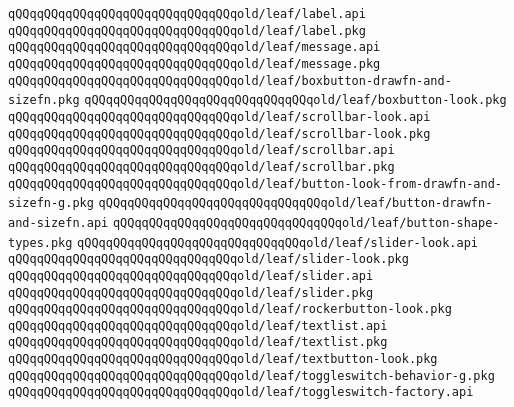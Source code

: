 \verb|qQQqqQQqqQQqqQQqqQQqqQQqqQQqqQQqold/leaf/label.api|\newline
\verb|qQQqqQQqqQQqqQQqqQQqqQQqqQQqqQQqold/leaf/label.pkg|\newline
\verb|qQQqqQQqqQQqqQQqqQQqqQQqqQQqqQQqold/leaf/message.api|\newline
\verb|qQQqqQQqqQQqqQQqqQQqqQQqqQQqqQQqold/leaf/message.pkg|\newline
\verb|qQQqqQQqqQQqqQQqqQQqqQQqqQQqqQQqold/leaf/boxbutton-drawfn-and-sizefn.pkg|\newline
\verb|qQQqqQQqqQQqqQQqqQQqqQQqqQQqqQQqold/leaf/boxbutton-look.pkg|\newline
\verb|qQQqqQQqqQQqqQQqqQQqqQQqqQQqqQQqold/leaf/scrollbar-look.api|\newline
\verb|qQQqqQQqqQQqqQQqqQQqqQQqqQQqqQQqold/leaf/scrollbar-look.pkg|\newline
\verb|qQQqqQQqqQQqqQQqqQQqqQQqqQQqqQQqold/leaf/scrollbar.api|\newline
\verb|qQQqqQQqqQQqqQQqqQQqqQQqqQQqqQQqold/leaf/scrollbar.pkg|\newline
\verb|qQQqqQQqqQQqqQQqqQQqqQQqqQQqqQQqold/leaf/button-look-from-drawfn-and-sizefn-g.pkg|\newline
\verb|qQQqqQQqqQQqqQQqqQQqqQQqqQQqqQQqold/leaf/button-drawfn-and-sizefn.api|\newline
\verb|qQQqqQQqqQQqqQQqqQQqqQQqqQQqqQQqold/leaf/button-shape-types.pkg|\newline
\verb|qQQqqQQqqQQqqQQqqQQqqQQqqQQqqQQqold/leaf/slider-look.api|\newline
\verb|qQQqqQQqqQQqqQQqqQQqqQQqqQQqqQQqold/leaf/slider-look.pkg|\newline
\verb|qQQqqQQqqQQqqQQqqQQqqQQqqQQqqQQqold/leaf/slider.api|\newline
\verb|qQQqqQQqqQQqqQQqqQQqqQQqqQQqqQQqold/leaf/slider.pkg|\newline
\verb|qQQqqQQqqQQqqQQqqQQqqQQqqQQqqQQqold/leaf/rockerbutton-look.pkg|\newline
\verb|qQQqqQQqqQQqqQQqqQQqqQQqqQQqqQQqold/leaf/textlist.api|\newline
\verb|qQQqqQQqqQQqqQQqqQQqqQQqqQQqqQQqold/leaf/textlist.pkg|\newline
\verb|qQQqqQQqqQQqqQQqqQQqqQQqqQQqqQQqold/leaf/textbutton-look.pkg|\newline
\verb|qQQqqQQqqQQqqQQqqQQqqQQqqQQqqQQqold/leaf/toggleswitch-behavior-g.pkg|\newline
\verb|qQQqqQQqqQQqqQQqqQQqqQQqqQQqqQQqold/leaf/toggleswitch-factory.api|\newline

